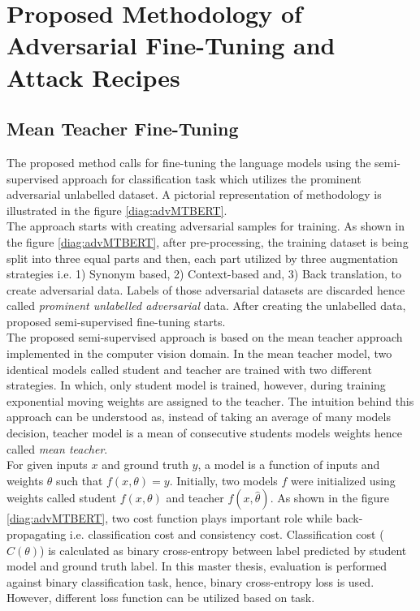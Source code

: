 \documentclass[%
	BCOR=8mm, %
	DIV=12,
	toc=bibliography, %
	toc=listof, %
	oneside, %
	egregdoesnotlikesansseriftitles, %
	]{scrbook}
\begin{document}

\chapter{ Proposed Methodology of Adversarial Fine-Tuning and Attack Recipes}
\label{chapter:methodology}
\section{Mean Teacher Fine-Tuning}
\label{section:Meanteacher}
The proposed method calls for fine-tuning the language models using the semi-supervised approach for classification task which utilizes the prominent adversarial unlabelled dataset. A pictorial representation of methodology is illustrated in the figure \ref{diag:advMTBERT}.\\
The approach  starts with creating adversarial samples for training. As shown in the figure \ref{diag:advMTBERT}, after pre-processing, the training dataset is being split into three equal parts and then, each part utilized by three augmentation strategies  i.e. 1) Synonym based, 2) Context-based and, 3) Back translation, to create adversarial data.  Labels of those adversarial datasets are discarded hence called \textit{prominent unlabelled adversarial} data. After creating the unlabelled data, proposed semi-supervised fine-tuning starts.\\
The proposed semi-supervised approach is based on the mean teacher approach \cite{tarvainen_mean_2018} implemented in the computer vision domain. In the mean teacher model, two identical models called student and teacher are trained with two different strategies. In which, only student model is trained, however, during training exponential moving weights are assigned to the teacher. The intuition behind this approach can be understood as, instead of taking an average of many models decision, teacher model is a mean of consecutive students models weights hence called \textit{mean teacher}. \\
 For given inputs $x$ and ground truth $y$, a model is a function of inputs and weights $\theta$ such that $f(x,\theta)=y$. Initially, two models $f$ were initialized using weights called student $f(x,\theta)$ and teacher $f(x,\hat\theta)$.
As shown in the figure \ref{diag:advMTBERT}, two cost function plays important role while back-propagating i.e. classification cost and consistency cost. Classification cost ($C(\theta)$) is calculated as binary cross-entropy between label predicted by student model and ground truth label.  In this master thesis, evaluation is performed against binary classification task, hence, binary cross-entropy loss is used. However, different loss function can be utilized based on task.\\ 
\end{document}
